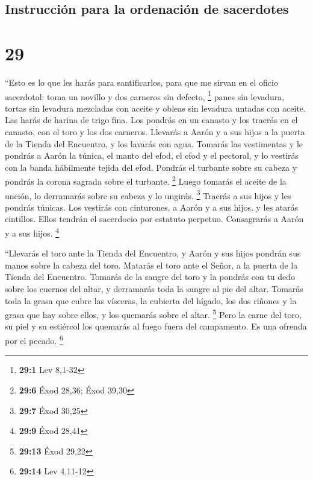 \hypertarget{instrucciuxf3n-para-la-ordenaciuxf3n-de-sacerdotes}{%
\subsection{Instrucción para la ordenación de
sacerdotes}\label{instrucciuxf3n-para-la-ordenaciuxf3n-de-sacerdotes}}

\hypertarget{section-28}{%
\section{29}\label{section-28}}

 ``Esto es lo que les harás para santificarlos, para que
me sirvan en el oficio sacerdotal: toma un novillo y dos carneros sin
defecto, \footnote{\textbf{29:1} Lev 8,1-32}  panes sin
levadura, tortas sin levadura mezcladas con aceite y obleas sin levadura
untadas con aceite. Las harás de harina de trigo fina. 
Los pondrás en un canasto y los traerás en el canasto, con el toro y los
dos carneros.  Llevarás a Aarón y a sus hijos a la puerta
de la Tienda del Encuentro, y los lavarás con agua. 
Tomarás las vestimentas y le pondrás a Aarón la túnica, el manto del
efod, el efod y el pectoral, y lo vestirás con la banda hábilmente
tejida del efod.  Pondrás el turbante sobre su cabeza y
pondrás la corona sagrada sobre el turbante. \footnote{\textbf{29:6}
  Éxod 28,36; Éxod 39,30}  Luego tomarás el aceite de la
unción, lo derramarás sobre su cabeza y lo ungirás. \footnote{\textbf{29:7}
  Éxod 30,25}  Traerás a sus hijos y les pondrás túnicas.
 Los vestirás con cinturones, a Aarón y a sus hijos, y les
atarás cintillos. Ellos tendrán el sacerdocio por estatuto perpetuo.
Consagrarás a Aarón y a sus hijos. \footnote{\textbf{29:9} Éxod 28,41}

 ``Llevarás el toro ante la Tienda del Encuentro, y Aarón
y sus hijos pondrán sus manos sobre la cabeza del toro. 
Matarás el toro ante el Señor, a la puerta de la Tienda del Encuentro.
 Tomarás de la sangre del toro y la pondrás con tu dedo
sobre los cuernos del altar, y derramarás toda la sangre al pie del
altar.  Tomarás toda la grasa que cubre las vísceras, la
cubierta del hígado, los dos riñones y la grasa que hay sobre ellos, y
los quemarás sobre el altar. \footnote{\textbf{29:13} Éxod 29,22}
 Pero la carne del toro, su piel y su estiércol los
quemarás al fuego fuera del campamento. Es una ofrenda por el pecado.
\footnote{\textbf{29:14} Lev 4,11-12}

